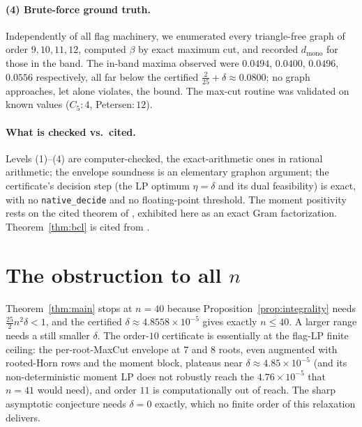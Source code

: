 \documentclass[11pt]{article}
\theoremstyle{remark}
\newcommand{\bip}{\beta}
\newcommand{\dmono}{d_{\mathrm{mono}}}
\begin{document}
\paragraph{(4) Brute-force ground truth.} Independently of all flag machinery, we
enumerated every triangle-free graph of order $9,10,11,12$, computed $\bip$ by
exact maximum cut, and recorded $\dmono$ for those in the band. The in-band maxima
observed were $0.0494$, $0.0400$, $0.0496$, $0.0556$ respectively, all far below
the certified $\tfrac2{25}+\delta\approx 0.0800$; no graph approaches, let alone
violates, the bound. The max-cut routine was validated on known values
($C_5\!:4$, Petersen$:12$).

\paragraph{What is checked vs.\ cited.} Levels (1)--(4) are computer-checked, the
exact-arithmetic ones in rational arithmetic; the envelope soundness is an
elementary graphon argument; the certificate's decision step (the LP optimum
$\eta=\delta$ and its dual feasibility) is exact, with no \texttt{native\_decide}
and no floating-point threshold. The moment positivity rests on the cited theorem
of \cite{Raz07}, exhibited here as an exact Gram factorization.
Theorem~\ref{thm:bcl} is cited from \cite{BCL21}.

\section{The obstruction to all $n$}\label{sec:open}

Theorem~\ref{thm:main} stops at $n=40$ because Proposition~\ref{prop:integrality}
needs $\tfrac{25}{2}n^2\delta<1$, and the certified $\delta\approx 4.8558\times10^{-5}$
gives exactly $n\le 40$. A larger range needs a still smaller $\delta$. The order-$10$
certificate is essentially at the flag-LP finite ceiling: the per-root-MaxCut envelope
at $7$ and $8$ roots, even augmented with rooted-Horn rows and the moment block,
plateaus near $\delta\approx 4.85\times10^{-5}$ (and its non-deterministic moment LP
does not robustly reach the $4.76\times10^{-5}$ that $n=41$ would need), and order $11$
is computationally out of reach. The sharp asymptotic conjecture needs $\delta=0$
exactly, which no finite order of this relaxation delivers.
\end{document}
